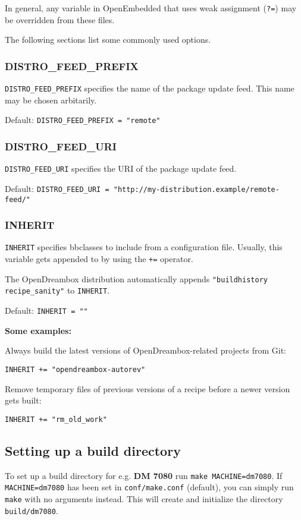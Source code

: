 \documentclass[a4paper]{article}
\newcommand{\shell}[1]{\texttt{\small #1}}
\begin{document}
     In general, any variable in OpenEmbedded that uses weak assignment (\shell{?=}) may be
     overridden from these files.

     The following sections list some commonly used options.

     \subsubsection{DISTRO\_FEED\_PREFIX}

       \shell{DISTRO\_FEED\_PREFIX} specifies the name of the package update feed.
       This name may be chosen arbitarily.

       Default: \shell{DISTRO\_FEED\_PREFIX = "remote"}

     \subsubsection{DISTRO\_FEED\_URI}

       \shell{DISTRO\_FEED\_URI} specifies the URI of the package update feed.

       Default: \shell{DISTRO\_FEED\_URI = "http://my-distribution.example/remote-feed/"}

     \subsubsection{INHERIT}

       \shell{INHERIT} specifies bbclasses to include from a configuration file. Usually,
       this variable gets appended to by using the \shell{+=} operator.

       The OpenDreambox distribution automatically appends \shell{"buildhistory recipe\_sanity"} to \shell{INHERIT}.

       Default: \shell{INHERIT = ""}

       \textbf{Some examples:}

       Always build the latest versions of OpenDreambox-related projects from Git:

       \shell{INHERIT += "opendreambox-autorev"}

       Remove temporary files of previous versions of a recipe before a newer version gets built:

       \shell{INHERIT += "rm\_old\_work"}

  \subsection{Setting up a build directory}
     To set up a build directory for e.g. \textbf{DM 7080} run \shell{make MACHINE=dm7080}. If
     \shell{MACHINE=dm7080} has been set in \shell{conf/make.conf} (default), you can simply run \shell{make}
     with no arguments instead. This will create and initialize the directory \shell{build/dm7080}.
\end{document}
